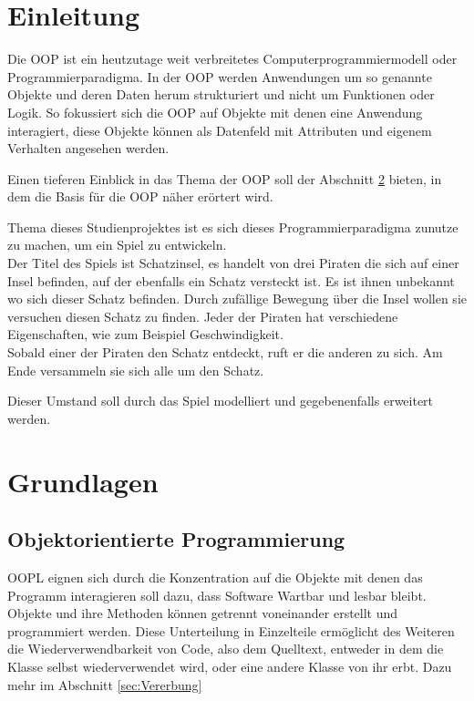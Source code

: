 \documentclass[
	12pt, %
	a4paper,
	listof=totoc, %
	bibliography=totoc, %
	numbers=noenddot, %
	ngerman, %
	headsepline, %
	oneside %
	]{scrbook} %
\begin{document}
\printnoidxglossaries

\clearpage



\chapter{Einleitung}\label{sec:einleitung}
Die \gls{OOP} ist ein heutzutage weit verbreitetes Computerprogrammiermodell oder Programmierparadigma. In der \gls{OOP} werden Anwendungen um so genannte Objekte und deren Daten herum strukturiert und nicht um Funktionen oder Logik. So fokussiert sich die \gls{OOP} auf Objekte mit denen eine Anwendung interagiert, diese Objekte können als Datenfeld mit Attributen und eigenem Verhalten angesehen werden.

Einen tieferen Einblick in das Thema der \gls{OOP} soll der Abschnitt \ref{sec:Gundlagen} bieten, in dem die Basis für die \gls{OOP} näher erörtert wird.

Thema dieses Studienprojektes ist es sich dieses Programmierparadigma zunutze zu machen, um ein Spiel zu entwickeln.\\
Der Titel des Spiels ist \glqq Schatzinsel\grqq, es handelt von drei Piraten die sich auf einer Insel befinden, auf der ebenfalls ein Schatz versteckt ist. Es ist ihnen unbekannt wo sich dieser Schatz befinden. Durch zufällige Bewegung über die Insel wollen sie versuchen diesen Schatz zu finden. Jeder der Piraten hat verschiedene Eigenschaften, wie zum Beispiel Geschwindigkeit.\\
Sobald einer der Piraten den Schatz entdeckt, ruft er die anderen zu sich. Am Ende versammeln sie sich alle um den Schatz.

Dieser Umstand soll durch das Spiel modelliert und gegebenenfalls erweitert werden.

\chapter{Grundlagen}\label{sec:Gundlagen}
\section{Objektorientierte Programmierung}
\gls{OOPL} eignen sich durch die Konzentration auf die Objekte mit denen das Programm interagieren soll dazu, dass Software Wartbar und lesbar bleibt. Objekte und ihre Methoden können getrennt voneinander erstellt und programmiert werden. Diese Unterteilung in Einzelteile ermöglicht des Weiteren die Wiederverwendbarkeit von Code, also dem Quelltext, entweder in dem die Klasse selbst wiederverwendet wird, oder eine andere Klasse von ihr erbt. Dazu mehr im Abschnitt \ref{sec:Vererbung}
\end{document}
